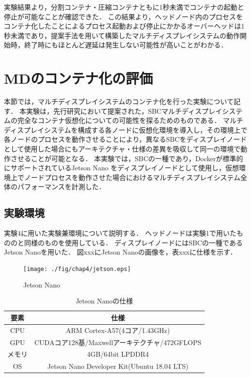 実験結果より，分割コンテナ・圧縮コンテナともに1秒未満でコンテナの起動と停止が可能なことが確認できた．
この結果より，ヘッドノード内のプロセスをコンテナ化したことによるプロセス起動および停止にかかるオーバーヘッドは1秒未満であり，提案手法を用いて構築したマルチディスプレイシステムの動作開始時，終了時にもほとんど遅延は発生しない可能性が高いことがわかる．

\section{MDのコンテナ化の評価}
本節では，マルチディスプレイシステムのコンテナ化を行った実験について記す．
本実験は，先行研究において提案された，SBCマルチディスプレイシステムの完全なコンテナ仮想化についての可能性を探るためのものである．
マルチディスプレイシステムを構成する各ノードに仮想化環境を導入し，その環境上で各ノードのプロセスを動作させることにより，異なるSBCをディスプレイノードとして使用した場合にもアーキテクチャ・仕様の差異を吸収して同一の環境で動作させることが可能となる．
本実験では，SBCの一種であり，Dockerが標準的にサポートされているJetson Nano \cite{jetson}をディスプレイノードとして使用し，仮想環境上でノードプロセスを動作させた場合におけるマルチディスプレイシステム全体のパフォーマンスを計測した．

\subsection*{実験環境}
実験4に用いた実験兼環境について説明する．
ヘッドノードは実験1で用いたもののと同様のものを使用している．
ディスプレイノードにはSBCの一種であるJetson Nanoを用いた．
図xxxにJetson Nanoの画像を，表xxxに仕様を示す．

\begin{figure}[H]
    \hspace*{\fill}
    \texttt{[image: ./fig/chap4/jetson.eps]}
    \hspace*{\fill}
    \caption{Jetson Nano}
\end{figure}

\begin{table}[H]
    \caption{Jetson Nanoの仕様}
    \begin{center}
    \begin{tabular}{cc}
    \hline
    要素 & 仕様 \\\hline\hline
    CPU & ARM Cortex-A57(4コア/1.43GHz) \\ \hline
    GPU & CUDAコア128基/Maxwellアーキテクチャ/472GFLOPS \\ \hline
    メモリ & 4GB/64bit LPDDR4 \\ \hline
    OS & Jetson Nano Developer Kit(Ubuntu 18.04 LTS)\\ \hline

    \end{tabular}
    \end{center}
\end{table}

